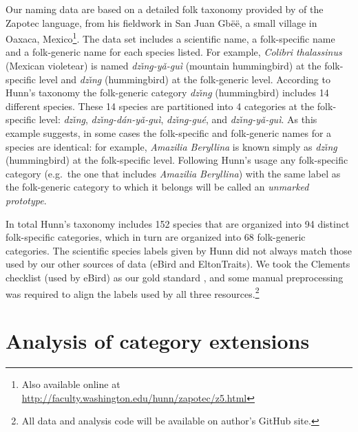 \documentclass[10pt,letterpaper]{article}
\begin{document}
Our naming data are based on a detailed folk taxonomy provided by  of the Zapotec language, from his fieldwork in San Juan Gb\"{e}\"{e}, a small village in Oaxaca, Mexico\footnote{ Also available online at \url{http://faculty.washington.edu/hunn/zapotec/z5.html}}. The data set includes a scientific name,  a folk-specific name and a folk-generic name for each species listed. For example, \emph{ Colibri thalassinus} (Mexican violetear) is named \textit{dz\v{\i}n\b{g}-y\v{a}-gu\`{i}} (mountain hummingbird) at the folk-specific level and \textit{dz\v{\i}n\b{g}} (hummingbird) at the folk-generic level.  According to Hunn's taxonomy the folk-generic category \textit{dz\v{\i}n\b{g}} (hummingbird) includes 14 different species. These 14 species are partitioned into 4 categories at the folk-specific level: \textit{dz\v{\i}n\b{g}}, \textit{dz\v{\i}n\b{g}-d\'{a}n-y\v{a}-gu\`{i}}, \textit{dz\v{\i}n\b{g}-gu\'{e}}, and \textit{dz\v{\i}n\b{g}-y\v{a}-gu\`{i}}.
As this example suggests, in some cases the folk-specific and folk-generic names for a species are identical: for example, 
 \emph{ Amazilia Beryllina} is known simply as \textit{dz\v{\i}n\b{g}} (hummingbird) at the folk-specific level.  Following Hunn's usage any folk-specific category (e.g.\ the one that includes \emph{ Amazilia Beryllina}) with the same label as the folk-generic category to which it belongs will be called an \emph{unmarked prototype}.

In total Hunn's taxonomy includes 152 species that are organized into 94 distinct folk-specific categories, which in turn are organized into 68 folk-generic categories.  The scientific species labels given by Hunn  did not always match those used by our other sources of data (eBird and EltonTraits).  We took the Clements checklist (used by eBird) as our gold standard \cite{clements2007clements}, and some manual preprocessing was required to align the labels used by all three resources.\footnote{All data and analysis code will be available on author's GitHub site.}



\section{Analysis of category extensions}
\end{document}
